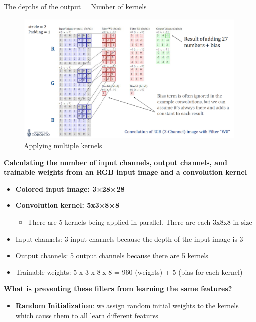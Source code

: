 \begin{theorem}
    The depths of the output = Number of kernels
\end{theorem}

\begin{figure}[h!t]
    \centering
    \includegraphics[width=0.75\linewidth]{examplemultiplekernels.png}
    \caption{Applying multiple kernels}
    \label{fig:enter-label}
\end{figure}

\begin{example}
    \textbf{Calculating the number of input channels, output channels, and trainable weights from an RGB input image and a convolution kernel}

    \begin{itemize}
        \item \textbf{Colored input image: 3×28×28}
        \item \textbf{Convolution kernel: 5x3×8×8 }
        \begin{itemize}
            \item There are 5 kernels being applied in parallel. There are each 3x8x8 in size
        \end{itemize}
    \end{itemize}

\begin{itemize}
    \item Input channels: 3 input channels because the depth of the input image is 3
    \item Output channels: 5 output channels because there are 5 kernels
    \item  Trainable weights: 5 x 3 x 8 x 8 = 960 (weights) + 5 (bias for each kernel)
\end{itemize}

\end{example}

\textbf{What is preventing these filters from learning the same features?}
\begin{itemize}
    \item \textbf{Random Initialization}: we assign random initial weights to the kernels which cause them to all learn different features
\end{itemize}


